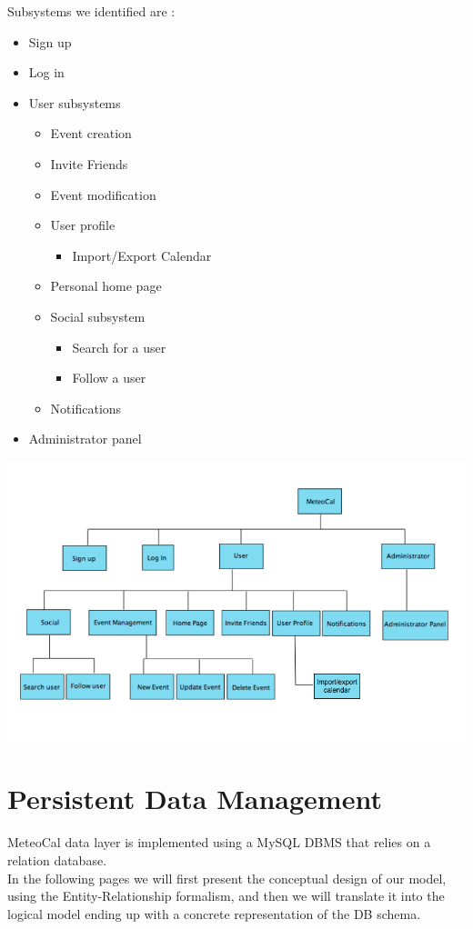 \documentclass[12pt]{book}
\begin{document}
Subsystems we identified are : 
\begin{itemize}
\item{Sign up}
\item{Log in}
\item{User subsystems}
	\begin{itemize}
	\item{Event creation}
	\item{Invite Friends}
	\item{Event modification}
	\item{User profile}
		\begin{itemize}
		\item{Import/Export Calendar}
		\end{itemize}
	\item{Personal home page}
	\item{Social subsystem}
		\begin{itemize}
		\item{Search for a user}
		\item{Follow a user}
		\end{itemize}
	\item{Notifications}
	\end{itemize}
\item{Administrator panel}

\end{itemize}

\begin{landscape}
\begin{center}
\includegraphics[scale=0.9]{subsystem}\\
\end{center}
\end{landscape}

\chapter{Persistent Data Management}
MeteoCal data layer is implemented using a MySQL DBMS that relies on a relation database.\\
In the following pages we will first present the conceptual design of our model, using the Entity-Relationship formalism, and then we will translate it into the logical model ending up with a concrete representation of the DB schema.\\
\end{document}
